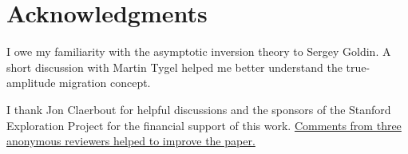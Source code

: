 \section{Acknowledgments}
I owe my familiarity with the asymptotic inversion theory to Sergey
Goldin. A short discussion with Martin Tygel helped me better
understand the true-amplitude migration concept.

I thank Jon Claerbout for helpful discussions and the sponsors of the Stanford
Exploration Project for the financial support of this work. \uline{Comments
  from three anonymous reviewers helped to improve the paper.}


